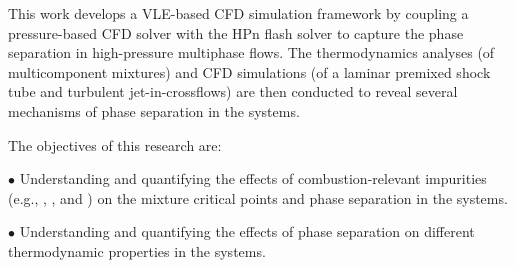 This work develops a VLE-based CFD simulation framework by coupling a pressure-based CFD solver with the HPn flash solver to capture the phase separation in high-pressure multiphase flows. The thermodynamics analyses (of multicomponent mixtures) and CFD simulations (of a laminar premixed shock tube and turbulent jet-in-crossflows) are then conducted to reveal several mechanisms of phase separation in the  systems.

The objectives of this research are:

\noindent$\bullet$ Understanding and quantifying the effects of combustion-relevant impurities (e.g., , , and ) on the mixture critical points and phase separation in the  systems. %

\noindent$\bullet$ Understanding and quantifying the effects of phase separation on different thermodynamic properties in the  systems.

